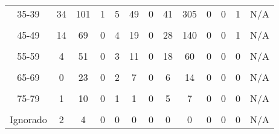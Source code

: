 {\begin{tabular}[t]{ccccccccccccc}
		35-39 & 34 & 101 & 1 & 5 & 49 & 0 & 41 & 305 & 0 & 0 & 1 & N/A\\
		\cellcolor[HTML]{B6B3FF}{40-44} & \cellcolor[HTML]{B6B3FF}{13} & \cellcolor[HTML]{B6B3FF}{87} & \cellcolor[HTML]{B6B3FF}{0} & \cellcolor[HTML]{B6B3FF}{4} & \cellcolor[HTML]{B6B3FF}{28} & \cellcolor[HTML]{B6B3FF}{0} & \cellcolor[HTML]{B6B3FF}{48} & \cellcolor[HTML]{B6B3FF}{245} & \cellcolor[HTML]{B6B3FF}{0} & \cellcolor[HTML]{B6B3FF}{0} & \cellcolor[HTML]{B6B3FF}{0} & \cellcolor[HTML]{B6B3FF}{N/A}\\
		45-49 & 14 & 69 & 0 & 4 & 19 & 0 & 28 & 140 & 0 & 0 & 1 & N/A\\
		\cellcolor[HTML]{B6B3FF}{50-54} & \cellcolor[HTML]{B6B3FF}{5} & \cellcolor[HTML]{B6B3FF}{46} & \cellcolor[HTML]{B6B3FF}{0} & \cellcolor[HTML]{B6B3FF}{2} & \cellcolor[HTML]{B6B3FF}{10} & \cellcolor[HTML]{B6B3FF}{0} & \cellcolor[HTML]{B6B3FF}{20} & \cellcolor[HTML]{B6B3FF}{97} & \cellcolor[HTML]{B6B3FF}{0} & \cellcolor[HTML]{B6B3FF}{0} & \cellcolor[HTML]{B6B3FF}{0} & \cellcolor[HTML]{B6B3FF}{N/A}\\
		55-59 & 4 & 51 & 0 & 3 & 11 & 0 & 18 & 60 & 0 & 0 & 0 & N/A\\
		\cellcolor[HTML]{B6B3FF}{60-64} & \cellcolor[HTML]{B6B3FF}{1} & \cellcolor[HTML]{B6B3FF}{36} & \cellcolor[HTML]{B6B3FF}{0} & \cellcolor[HTML]{B6B3FF}{1} & \cellcolor[HTML]{B6B3FF}{9} & \cellcolor[HTML]{B6B3FF}{0} & \cellcolor[HTML]{B6B3FF}{5} & \cellcolor[HTML]{B6B3FF}{49} & \cellcolor[HTML]{B6B3FF}{0} & \cellcolor[HTML]{B6B3FF}{0} & \cellcolor[HTML]{B6B3FF}{0} & \cellcolor[HTML]{B6B3FF}{N/A}\\
		65-69 & 0 & 23 & 0 & 2 & 7 & 0 & 6 & 14 & 0 & 0 & 0 & N/A\\
		\cellcolor[HTML]{B6B3FF}{70-74} & \cellcolor[HTML]{B6B3FF}{2} & \cellcolor[HTML]{B6B3FF}{17} & \cellcolor[HTML]{B6B3FF}{0} & \cellcolor[HTML]{B6B3FF}{2} & \cellcolor[HTML]{B6B3FF}{6} & \cellcolor[HTML]{B6B3FF}{0} & \cellcolor[HTML]{B6B3FF}{2} & \cellcolor[HTML]{B6B3FF}{10} & \cellcolor[HTML]{B6B3FF}{0} & \cellcolor[HTML]{B6B3FF}{0} & \cellcolor[HTML]{B6B3FF}{0} & \cellcolor[HTML]{B6B3FF}{N/A}\\
		75-79 & 1 & 10 & 0 & 1 & 1 & 0 & 5 & 7 & 0 & 0 & 0 & N/A\\
		\cellcolor[HTML]{B6B3FF}{80 y más} & \cellcolor[HTML]{B6B3FF}{2} & \cellcolor[HTML]{B6B3FF}{10} & \cellcolor[HTML]{B6B3FF}{0} & \cellcolor[HTML]{B6B3FF}{0} & \cellcolor[HTML]{B6B3FF}{3} & \cellcolor[HTML]{B6B3FF}{0} & \cellcolor[HTML]{B6B3FF}{0} & \cellcolor[HTML]{B6B3FF}{8} & \cellcolor[HTML]{B6B3FF}{1} & \cellcolor[HTML]{B6B3FF}{0} & \cellcolor[HTML]{B6B3FF}{0} & \cellcolor[HTML]{B6B3FF}{N/A}\\
		Ignorado & 2 & 4 & 0 & 0 & 0 & 0 & 0 & 0 & 0 & 0 & 0 & N/A\\
		\bottomrule
	\end{tabular}}